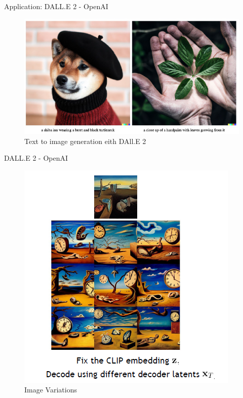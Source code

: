 \begin{frame}{Application: DALL.E 2 - OpenAI}
\begin{figure}
    \centering
    \includegraphics[height=0.8\textheight, width=\textwidth, keepaspectratio]{images/diffusion/diff_results_3.png}
    \caption{Text to image generation eith DAll.E 2}
\end{figure}
\end{frame}

\begin{frame}{DALL.E 2 - OpenAI}
\begin{figure}
    \centering
    \includegraphics[height=0.8\textheight, width=\textwidth, keepaspectratio]{images/diffusion/diff_results_4.png}
    \caption{Image Variations}
\end{figure}



\end{frame}

